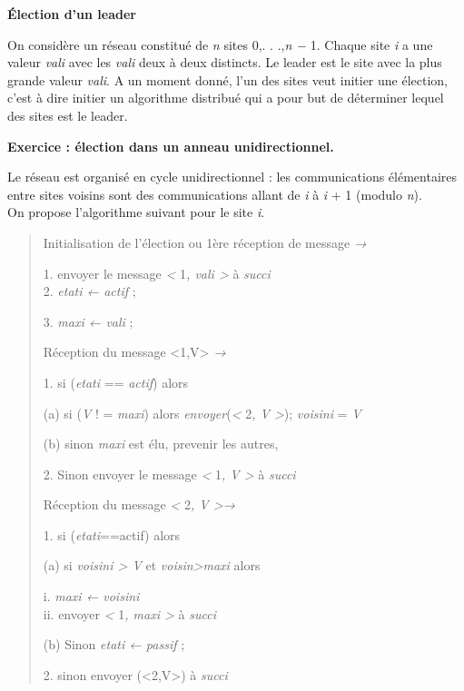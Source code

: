 \documentclass[
]{article}
\author{}
\date{}
\begin{document}
\textbf{Élection d'un leader}

On considère un réseau constitué de \emph{n} sites 0,. . .,\emph{n −} 1.
Chaque site \emph{i} a une valeur \emph{vali} avec les \emph{vali} deux
à deux distincts. Le leader est le site avec la plus grande valeur
\emph{vali}. A un moment donné, l'un des sites veut initier une
élection, c'est à dire initier un algorithme distribué qui a pour but de
déterminer lequel des sites est le leader.

\textbf{Exercice : élection dans un anneau unidirectionnel.}

Le réseau est organisé en cycle unidirectionnel : les communications
élémentaires entre sites voisins sont des communications allant de
\emph{i} à \emph{i} + 1 (modulo \emph{n}).\\
On propose l'algorithme suivant pour le site \emph{i}.

\begin{quote}
Initialisation de l'élection ou 1ère réception de message \emph{→}

1. envoyer le message \emph{\textless{}} 1\emph{, vali \textgreater{}} à
\emph{succi}\\
2. \emph{etati ← actif} ;

3. \emph{maxi ← vali} ;

Réception du message \textless1,V\textgreater{} \emph{→}

1. si (\emph{etati} == \emph{actif}) alors

(a) si (\emph{V} ! = \emph{maxi}) alors
\emph{envoyer}(\emph{\textless{}} 2\emph{, V \textgreater{}});
\emph{voisini} = \emph{V}

(b) sinon \emph{maxi} est élu, prevenir les autres,

2. Sinon envoyer le message \emph{\textless{}} 1\emph{, V
\textgreater{}} à \emph{succi}

Réception du message \emph{\textless{}} 2\emph{, V \textgreater→}

1. si (\emph{etati}==actif) alors

(a) si \emph{voisini \textgreater{} V} et \emph{voisin\textgreater maxi}
alors

i. \emph{maxi ← voisini}\\
ii. envoyer \emph{\textless{}} 1\emph{, maxi \textgreater{}} à
\emph{succi}

(b) Sinon \emph{etati ← passif} ;

2. sinon envoyer (\textless2,V\textgreater) à \emph{succi}
\end{quote}
\end{document}
